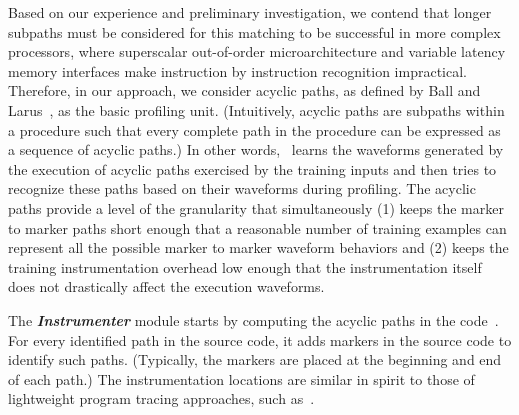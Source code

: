 Based on our experience and preliminary investigation, we contend that longer subpaths must be considered for this matching to be successful in more complex processors, where superscalar out-of-order microarchitecture and variable latency memory interfaces make instruction by instruction recognition impractical. Therefore, in our approach, we consider acyclic paths, as defined by Ball and Larus~\cite{Ball:1996:EPP:243846.243857}, as the basic profiling unit. (Intuitively, acyclic paths are subpaths within a procedure such that every complete path in the procedure can be expressed as a sequence of acyclic paths.)  In other words, \zop\ learns the waveforms generated by the execution of acyclic paths exercised by the training inputs and then tries to recognize these paths based on their waveforms during profiling. The acyclic paths provide a level of the granularity that simultaneously (1) keeps the marker to marker paths short enough that a reasonable number of training examples can represent all the possible marker to marker waveform behaviors and (2) keeps the training instrumentation overhead low enough that the instrumentation itself does not drastically affect the execution waveforms.

The \textbf{\textit{Instrumenter}} module starts by computing the acyclic paths in the code~\cite{Ball:1996:EPP:243846.243857}.  For every identified path in the source code, it adds markers in the source code to identify such paths. (Typically, the markers are placed at the beginning and end of each path.) The instrumentation locations are similar in spirit to those of lightweight program tracing approaches, such as~\cite{ohmann2013}.

